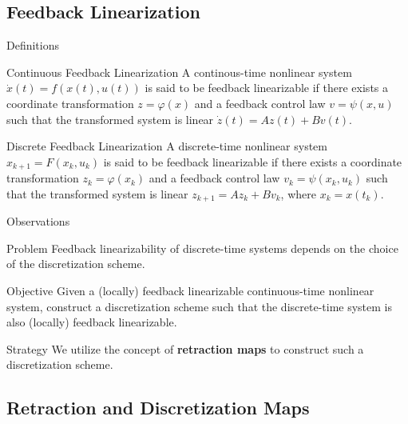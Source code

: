 \documentclass{beamer}
\begin{document}
\subsection{Feedback Linearization}
\begin{frame}{Definitions}
\begin{block}{Continuous Feedback Linearization}
  A continous-time nonlinear system $\dot{x}(t) = f(x(t), u(t))$ is said to be feedback linearizable if there exists a coordinate transformation $z = \varphi(x)$ and a feedback control law $v = \psi(x,u)$ such that the transformed system is linear $\dot{z}(t) = Az(t) + Bv(t)$.
\end{block}

\begin{block}{Discrete Feedback Linearization}
  A discrete-time nonlinear system $x_{k+1} = F(x_k, u_k)$ is said to be feedback linearizable if there exists a coordinate transformation $z_k = \varphi(x_k)$ and a feedback control law $v_k = \psi(x_k,u_k)$ such that the transformed system is linear $ z_{k+1} = Az_k + Bv_k $, where $x_k = x(t_k)$.
\end{block}

\end{frame}


\begin{frame}{Observations}
  \begin{block}{Problem}
    Feedback linearizability of discrete-time systems depends on the choice of the discretization scheme.
  \end{block}

  \begin{block}{Objective}
    Given a (locally) feedback linearizable continuous-time nonlinear system, construct a discretization scheme such that the discrete-time system is also (locally) feedback linearizable.
  \end{block}

  \begin{block}{Strategy}
    We utilize the concept of \textbf{retraction maps} to construct such a discretization scheme.
  \end{block}
  
\end{frame}
% 

\subsection{Retraction and Discretization Maps}
\end{document}

